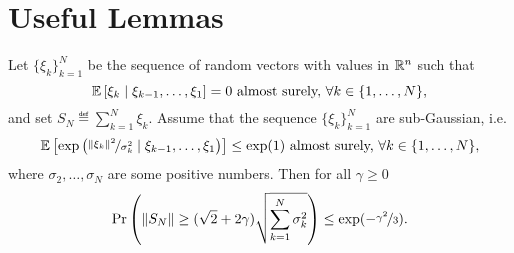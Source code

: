 \documentclass[a4paper,11pt]{article}
\begin{document}
\section{Useful Lemmas}

\begin{lemma}\label{lem:concentration_lemma} Let $\{\xi_k\}_{k=1}^N$ be the sequence of random vectors with values in $\mathbb{R}^n$ such that 
\[
\mathbb{E}\left[\xi_k \mid \xi_{k-1},\dots, \xi_1\right] = 0 \text{ almost surely, } \forall k\in\{1,\dots,N\},
\]
and set $S_N \eqdef \sum_{k=1}^N \xi_k$. Assume that the sequence $\{\xi_k\}_{k=1}^N$ are sub-Gaussian, i.e.
\[
\mathbb{E}\left[\exp\left(\nicefrac{\|\xi_k\|^2}{\sigma_k^2} \mid \xi_{k-1},\dots, \xi_1\right)\right] \le \exp(1) \text{ almost surely, } \forall k\in\{1,\dots,N\},
\]
where $\sigma_2,\dots,\sigma_N$ are some positive numbers. Then for all $\gamma \ge 0$
\begin{equation}
\Pr\left(\|S_N\| \ge (\sqrt{2}+2\gamma)\sqrt{\sum_{k=1}^N\sigma_k^2}\right) \le \exp(-\nicefrac{\gamma^2}{3}).
\end{equation}
\end{lemma}
\end{document}
